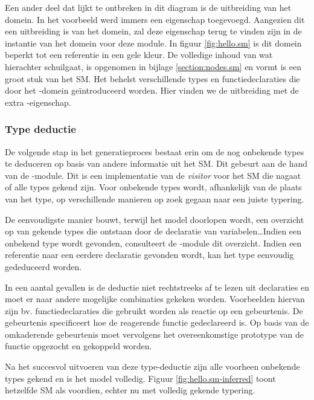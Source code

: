 Een ander deel dat lijkt te ontbreken in dit diagram is de uitbreiding van het
domein. In het voorbeeld werd immers een eigenschap  toegevoegd.
Aangezien dit een uitbreiding is van het domein, zal deze eigenschap terug te
vinden zijn in de instantie van het domein voor deze module. In figuur
\ref{fig:hello.sm} is dit domein beperkt tot een referentie in een gele kleur.
De volledige inhoud van wat hierachter schuilgaat, is opgenomen in bijlage
\ref{section:nodes.sm} en vormt is een groot stuk van het SM. Het behelst
verschillende types en functiedeclaraties die door het -domein
ge\"introduceerd worden. Hier vinden we de uitbreiding met de extra
-eigenschap.

\vspace{-3mm}

\subsubsection{Type deductie}

De volgende stap in het generatieproces bestaat erin om de nog onbekende types
te deduceren op basis van andere informatie uit het SM. Dit gebeurt aan de hand
van de -module. Dit is een implementatie van de \emph{visitor}
voor het SM die nagaat of alle types gekend zijn. Voor onbekende types wordt,
afhankelijk van de plaats van het type, op verschillende manieren op zoek
gegaan naar een juiste typering.

De eenvoudigste manier bouwt, terwijl het model doorlopen wordt, een overzicht
op van gekende types die ontstaan door de declaratie van variabelen\dots Indien
een onbekend type wordt gevonden, consulteert de -module dit
overzicht. Indien een referentie naar een eerdere declaratie gevonden wordt,
kan het type eenvoudig gededuceerd worden.

In een aantal gevallen is de deductie niet rechtstreeks af te lezen uit
declaraties en moet er naar andere mogelijke combinaties gekeken worden.
Voorbeelden hiervan zijn bv. functiedeclaraties die gebruikt worden als reactie
op een gebeurtenis. De gebeurtenis specificeert hoe de reagerende functie
gedeclareerd is. Op basis van de omkaderende gebeurtenis moet vervolgens het
overeenkomstige prototype van de functie opgezocht en gekoppeld worden.

Na het succesvol uitvoeren van deze type-deductie zijn alle voorheen onbekende
types gekend en is het model volledig. Figuur \ref{fig:hello.sm-inferred} toont
hetzelfde SM als voordien, echter nu met volledig gekende typering.


